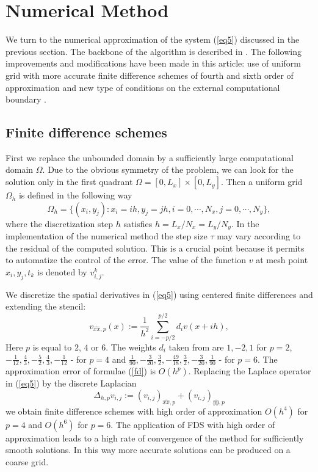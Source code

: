 \documentclass[preprint]{elsarticle}
\newcommand{\rf}[1]{(\ref{#1})}
\begin{document}
\section{Numerical Method}

We  turn  to the numerical approximation of the   system \rf{eq5} discussed in the previous section. The backbone of the  algorithm is  described in \cite{Ch2012}. The following  improvements and modifications have been made in this article: use of uniform grid with more accurate finite difference schemes of fourth and sixth order of approximation and new type of conditions on the external computational boundary \cite{bnd}.

\subsection{Finite difference schemes}
First we replace the unbounded domain by a sufficiently large computational domain $\Omega$. Due to the obvious symmetry of the problem, we can look for the solution only in the first quadrant $\Omega = [0,L_x] \times[0,L_y]$. Then a uniform grid $\Omega_h$ is defined in the following way
$$
\Omega_h = \{(x_i,y_j): x_i = ih, y_j = jh, i = 0,\cdots ,N_x, j = 0,\cdots , N_y \},
$$
where the discretization step $h$ satisfies
$ h = L_x/N_x = L_y/N_y$. 
 In the  implementation of the numerical method
the  step size $\tau$ may vary according to the residual of the computed solution. This is a crucial point because it permits  to automatize the control of the error.
The value of the function $v$ at mesh point $x_i,y_j,t_k$ is denoted by $v_{i,j}^k$.

We discretize the spatial  derivatives in \rf{eq5} using centered finite differences  
and extending the stencil:
\begin{equation}\label{fd}
v_{\widehat{xx},p}(x) :=  \frac{1}{h^2} \sum\limits_{i=-p/2}^{p/2} d_i v(x+ih),
\end{equation}
 Here $p$ is equal to $2$, $4$ or $6$.  The weights $d_i$ taken from  \cite{forn} are  
 $ 1,-2,1$ for $p=2$, $-\frac{1}{12}, \frac{4}{3}, -\frac{5}{2}, \frac{4}{3}, -\frac{1}{12}$ - for $p=4$ and  $\frac{1}{90}, -\frac{3}{20}, \frac{3}{2}, -\frac{49}{18}, \frac{3}{2}, -\frac{3}{20}, \frac{1}{90}$ - for $p=6$. The approximation error of  formulae \rf{fd} is $O(h^p)$. Replacing the Laplace operator in \rf{eq5} by the discrete Laplacian $$ \Delta_{h,p} v_{i,j} := (v_{i,j})_{\widehat{xx},p} + (v_{i,j})_{\widehat{yy},p}$$ we obtain finite difference schemes with high order of approximation $O(h^4)$ for $p=4$ and  $O(h^6)$ for $p=6 $.  The application of FDS with high order of approximation leads to a high rate of convergence of the method for   sufficiently smooth solutions.
In this way more accurate solutions can be produced on a coarse grid.
\end{document}
